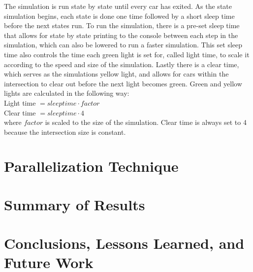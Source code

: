 \documentclass[conference]{IEEEtran}
\begin{document}
\hspace*{.2cm}  The simulation is run state by state until every car has exited. As the state simulation begins, each state is done one time followed by a short sleep time before the next states run. To run the simulation, there is a pre-set sleep time that allows for state by state printing to the console between each step in the simulation, which can also be lowered to run a faster simulation. This set sleep time also controls the time each green light is set for, called light time, to scale it according to the speed and size of the simulation. Lastly there is a clear time, which serves as the simulations yellow light, and allows for cars within the intersection to clear out before the next light becomes green. Green and yellow lights are calculated in the following way: \\

Light time $= sleep time \cdot factor$ \\

Clear time $= sleep time \cdot 4$ \\

where $factor$ is scaled to the size of the simulation. Clear time is always set to 4 because the intersection size is constant.





\section{Parallelization Technique}
\lipsum[3] \cite{ORourke2005}

\section{Summary of Results}
\lipsum[4]

\section{Conclusions, Lessons Learned, and Future Work}
\lipsum[5]



\end{document}
